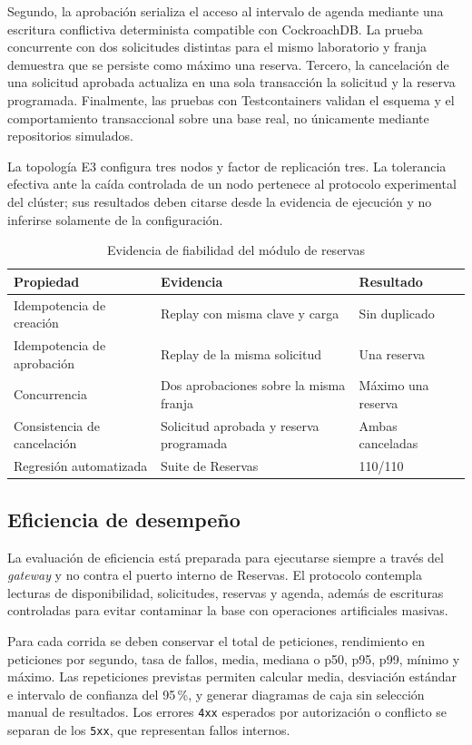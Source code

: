 Segundo, la aprobación serializa el acceso al intervalo de agenda mediante
una escritura conflictiva determinista compatible con CockroachDB. La
prueba concurrente con dos solicitudes distintas para el mismo laboratorio
y franja demuestra que se persiste como máximo una reserva. Tercero, la
cancelación de una solicitud aprobada actualiza en una sola transacción la
solicitud y la reserva programada. Finalmente, las pruebas con
Testcontainers validan el esquema y el comportamiento transaccional sobre
una base real, no únicamente mediante repositorios simulados.

La topología E3 configura tres nodos y factor de replicación tres. La
tolerancia efectiva ante la caída controlada de un nodo pertenece al
protocolo experimental del clúster; sus resultados deben citarse desde la
evidencia de ejecución y no inferirse solamente de la configuración.

\begin{table}[htbp]
\centering
\caption{Evidencia de fiabilidad del módulo de reservas}
\label{tab:iso-fiabilidad-reservas}
\begin{tabular}{lll}
\toprule
Propiedad & Evidencia & Resultado \\
\midrule
Idempotencia de creación & Replay con misma clave y carga & Sin duplicado \\
Idempotencia de aprobación & Replay de la misma solicitud & Una reserva \\
Concurrencia & Dos aprobaciones sobre la misma franja & Máximo una reserva \\
Consistencia de cancelación & Solicitud aprobada y reserva programada & Ambas canceladas \\
Regresión automatizada & Suite de Reservas & 110/110 \\
\bottomrule
\end{tabular}
\end{table}

\subsection{Eficiencia de desempeño}

La evaluación de eficiencia está preparada para ejecutarse siempre a
través del \emph{gateway} y no contra el puerto interno de Reservas. El
protocolo contempla lecturas de disponibilidad, solicitudes, reservas y
agenda, además de escrituras controladas para evitar contaminar la base con
operaciones artificiales masivas.

Para cada corrida se deben conservar el total de peticiones, rendimiento en
peticiones por segundo, tasa de fallos, media, mediana o p50, p95, p99,
mínimo y máximo. Las repeticiones previstas permiten calcular media,
desviación estándar e intervalo de confianza del 95\,\%, y generar
diagramas de caja sin selección manual de resultados. Los errores
\texttt{4xx} esperados por autorización o conflicto se separan de los
\texttt{5xx}, que representan fallos internos.

